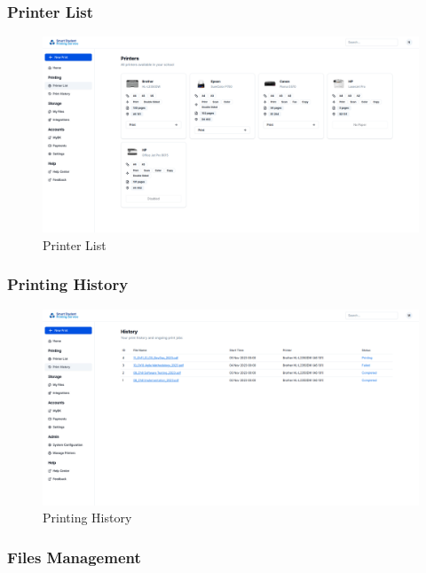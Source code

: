 \subsubsection{Printer List}

\begin{figure}[H]
    \centering
    \includegraphics[max width = 0.9\linewidth,origin = c]{chapters/8. Implementation - Sprint 2/6. Printer list.png}
    \caption{Printer List}%
\end{figure}

\subsubsection{Printing History}

\begin{figure}[H]
    \centering
    \includegraphics[max width = 0.9\linewidth,origin = c]{chapters/8. Implementation - Sprint 2/7. print history.png}
    \caption{Printing History}%
\end{figure}

\subsubsection{Files Management}

